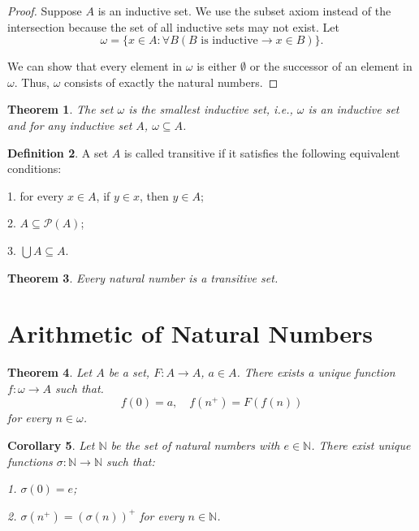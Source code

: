 \documentclass[12pt, reqno]{amsart}
\newtheorem{theorem}{Theorem}[section]
\newtheorem{corollary}[theorem]{Corollary}
\theoremstyle{definition}
\newtheorem{definition}[theorem]{Definition}
\theoremstyle{remark}
\numberwithin{equation}{section}
\begin{document}
{\begin{proof}
    Suppose $A$ is an inductive set. We use the subset axiom instead of the intersection because the set of all inductive sets may not exist. Let
    \[
        \omega = \{x\in A: \forall B (B \text{ is inductive} \to x\in B)\}.
    \]

    We can show that every element in $\omega$ is either $\emptyset$ or the successor of an element in $\omega$. Thus, $\omega$ consists of exactly the natural numbers.
\end{proof}

\begin{theorem}
    The set $\omega$ is the smallest inductive set, i.e., $\omega$ is an inductive set and for any inductive set $A$, $\omega \subseteq A$.
\end{theorem}

\begin{definition}
    A set $A$ is called transitive if it satisfies the following equivalent conditions:
    
    1. for every $x\in A$, if $y\in x$, then $y\in A$;

    2. $A \subseteq \mathcal{P}(A)$;

    3. $\bigcup A \subseteq A$.
\end{definition}

\begin{theorem}
    Every natural number is a transitive set.
\end{theorem}

\section{Arithmetic of Natural Numbers}

\begin{theorem}
Let $A$ be a set, $F: A \to A$, $a\in A$. There exists a unique function $f: \omega \to A$ such that.
\[
    f(0) = a, \quad f(n^+) = F(f(n))
\]
for every $n\in \omega$.
\end{theorem}

\begin{corollary}
    Let $\mathbb{N}$ be the set of natural numbers with $e \in \mathbb{N}$. There exist unique functions $\sigma: \mathbb{N} \to \mathbb{N}$ such that:

    1. $\sigma(0) = e$;

    2. $\sigma(n^+) = (\sigma(n))^+$ for every $n\in \mathbb{N}$.
\end{corollary}

}
\end{document}
